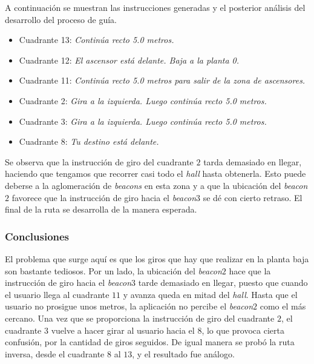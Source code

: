 A continuación se muestran las instrucciones generadas y el posterior análisis del desarrollo del proceso de guía.

\begin{itemize}
	\item Cuadrante 13: \textit{Continúa recto 5.0 metros.}
	
	\item Cuadrante 12: \textit{El ascensor está delante. Baja a la planta 0.}
	
	\item Cuadrante 11: \textit{Continúa recto 5.0 metros para salir de la zona de ascensores.}
	
	\item Cuadrante 2: \textit{Gira a la izquierda. Luego continúa recto 5.0 metros.}
	
	\item Cuadrante 3: \textit{Gira a la izquierda. Luego continúa recto 5.0 metros.}
	
	\item Cuadrante 8: \textit{Tu destino está delante.}
\end{itemize}


Se observa que la instrucción de giro del cuadrante $2$ tarda demasiado en llegar, haciendo que tengamos que recorrer casi todo el \textit{hall} hasta obtenerla. Esto puede deberse a la aglomeración de \textit{beacons} en esta zona y a que la ubicación del \textit{beacon$2$} favorece que la instrucción de giro hacia el \textit{beacon$3$} se dé con cierto retraso. El final de la ruta se desarrolla de la manera esperada. 

\subsubsection*{Conclusiones}

El problema que surge aquí es que los giros que hay que realizar en la planta baja son bastante tediosos. Por un lado, la ubicación del \textit{beacon$2$} hace que la instrucción de giro hacia el \textit{beacon$3$} tarde demasiado en llegar, puesto que cuando el usuario llega al cuadrante $11$ y avanza queda en mitad del \textit{hall}. Hasta que el usuario no prosigue unos metros, la aplicación no percibe el \textit{beacon$2$} como el más cercano. Una vez que se proporciona la instrucción de giro del cuadrante $2$, el cuadrante $3$ vuelve a hacer girar al usuario hacia el $8$, lo que provoca cierta confusión, por la cantidad de giros seguidos. De igual manera se probó la ruta inversa, desde el cuadrante $8$ al $13$, y el resultado fue análogo.

